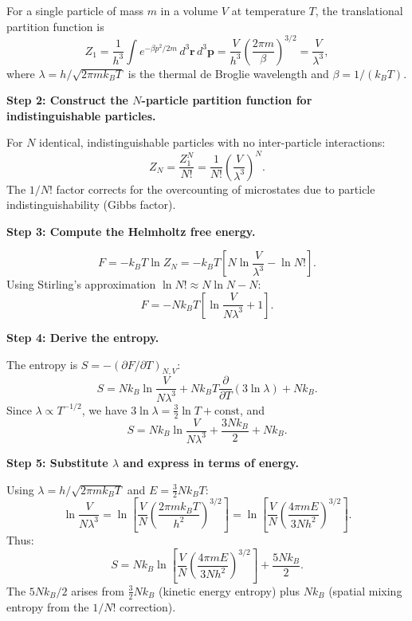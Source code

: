 For a single particle of mass $m$ in a volume $V$ at temperature $T$, the translational partition function is
\begin{equation}
Z_1 = \frac{1}{h^3}\int e^{-\beta p^2/2m}\,d^3\mathbf{r}\,d^3\mathbf{p} = \frac{V}{h^3}\left(\frac{2\pi m}{\beta}\right)^{3/2} = \frac{V}{\lambda^3},
\end{equation}
where $\lambda = h/\sqrt{2\pi m k_B T}$ is the thermal de Broglie wavelength and $\beta = 1/(k_BT)$.

\textbf{Step 2: Construct the $N$-particle partition function for indistinguishable particles.}

For $N$ identical, indistinguishable particles with no inter-particle interactions:
\begin{equation}
Z_N = \frac{Z_1^N}{N!} = \frac{1}{N!}\left(\frac{V}{\lambda^3}\right)^N.
\end{equation}
The $1/N!$ factor corrects for the overcounting of microstates due to particle indistinguishability (Gibbs factor).

\textbf{Step 3: Compute the Helmholtz free energy.}

\begin{equation}
F = -k_BT\ln Z_N = -k_BT\left[N\ln\frac{V}{\lambda^3} - \ln N!\right].
\end{equation}
Using Stirling's approximation $\ln N! \approx N\ln N - N$:
\begin{equation}
F = -Nk_BT\left[\ln\frac{V}{N\lambda^3} + 1\right].
\end{equation}

\textbf{Step 4: Derive the entropy.}

The entropy is $S = -(\partial F/\partial T)_{N,V}$:
\begin{equation}
S = Nk_B\ln\frac{V}{N\lambda^3} + Nk_BT\frac{\partial}{\partial T}(3\ln\lambda) + Nk_B.
\end{equation}
Since $\lambda \propto T^{-1/2}$, we have $3\ln\lambda = \frac{3}{2}\ln T + \text{const}$, and
\begin{equation}
S = Nk_B\ln\frac{V}{N\lambda^3} + \frac{3Nk_B}{2} + Nk_B.
\end{equation}

\textbf{Step 5: Substitute $\lambda$ and express in terms of energy.}

Using $\lambda = h/\sqrt{2\pi m k_BT}$ and $E = \frac{3}{2}Nk_BT$:
\begin{equation}
\ln\frac{V}{N\lambda^3} = \ln\left[\frac{V}{N}\left(\frac{2\pi mk_BT}{h^2}\right)^{3/2}\right] = \ln\left[\frac{V}{N}\left(\frac{4\pi m E}{3Nh^2}\right)^{3/2}\right].
\end{equation}
Thus:
\begin{equation}
\boxed{S = Nk_B\ln\left[\frac{V}{N}\left(\frac{4\pi m E}{3Nh^2}\right)^{3/2}\right] + \frac{5Nk_B}{2}.}
\end{equation}
The $5Nk_B/2$ arises from $\frac{3}{2}Nk_B$ (kinetic energy entropy) plus $Nk_B$ (spatial mixing entropy from the $1/N!$ correction).

